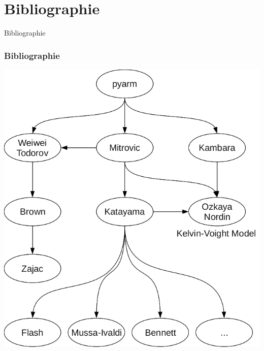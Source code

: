 \documentclass{beamer}
\begin{document}
\section{Bibliographie}
\begin{frame}
\begin{center}
{\LARGE Bibliographie}
\end{center}
\end{frame}

\begin{frame}
\frametitle{Bibliographie}
\begin{center}
        \includegraphics[width=.60\linewidth]{fig/bib}
\end{center}
\end{frame}
\end{document}
